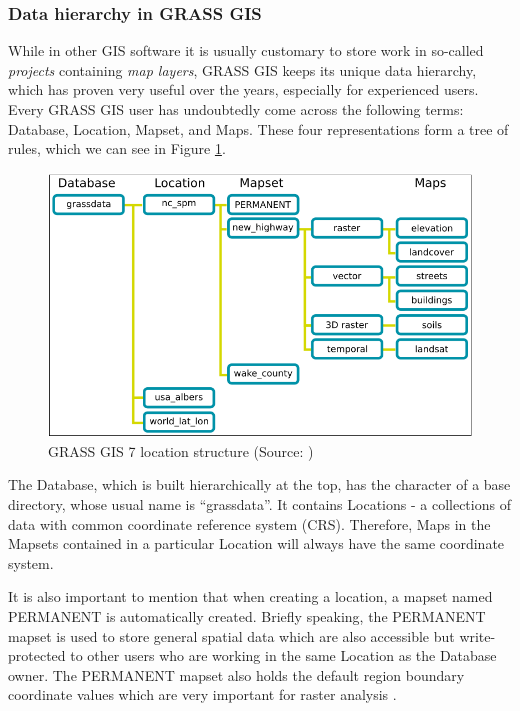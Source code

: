 \documentclass[a4paper,10pt,twoside]{article}
\begin{document}
\newpage
\vspace*{-1cm}
\subsubsection{Data hierarchy in GRASS GIS}
\label{subsection:hierarchy}
\noindent
\large

\noindent While in other GIS software it is usually customary to store
work in so-called \textit{projects} containing \textit{map layers},
GRASS GIS keeps its unique data hierarchy, which has proven very
useful over the years, especially for experienced users. Every GRASS
GIS user has undoubtedly come across the following terms: Database,
Location, Mapset, and Maps. These four representations form a tree of
rules, which we can see in Figure \ref{fig:grass_data_hierarchy}.

\vspace{0.3cm}
\begin{figure}[hbt!]
\begin{center}
\includegraphics[width=14cm]{../pictures/grass_data_hiearchy.png} 
\caption[GRASS GIS 7 location structure]{GRASS GIS 7 location structure (Source: \cite{hierarchy})}
\label{fig:grass_data_hierarchy}
\end{center}
\end{figure}

\noindent The Database, which is built hierarchically at the top, has
the character of a base directory, whose usual name is
``grassdata''. It contains Locations - a collections of data with
common coordinate reference system (CRS). Therefore, Maps in the
Mapsets contained in a particular Location will always have the same
coordinate system.

It is also important to mention that when creating a location, a
mapset named PERMANENT is automatically created. Briefly speaking, the
PERMANENT mapset is used to store general spatial data which are also
accessible but write-protected to other users who are working in the
same Location as the Database owner. The PERMANENT mapset also holds
the default region boundary coordinate values which are very important
for raster analysis \cite{hierarchy}.
\end{document}
